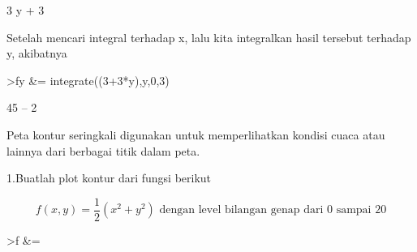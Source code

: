\documentclass[a4paper,10pt]{article}
\begin{document}
\begin{eulernotebook}
\begin{eulercomment}
\begin{eulercomment}
\begin{eulercomment}
\begin{eulercomment}
\begin{eulercomment}
\begin{eulercomment}
\begin{eulercomment}
\begin{eulercomment}
\begin{eulercomment}
\begin{eulercomment}
\begin{eulercomment}
\begin{eulercomment}
\begin{eulercomment}
\begin{eulercomment}
\begin{eulercomment}
\begin{eulercomment}
\begin{eulercomment}
\begin{eulercomment}
\begin{eulercomment}
\begin{eulercomment}
\begin{eulercomment}
\begin{eulercomment}
\begin{eulercomment}
\begin{eulercomment}
\begin{eulercomment}
\begin{eulercomment}
\begin{eulercomment}
\begin{eulercomment}
\begin{eulercomment}
\begin{eulercomment}
\begin{eulercomment}
\begin{eulercomment}
\begin{eulercomment}
\begin{eulercomment}
\begin{eulercomment}
\begin{eulercomment}
\begin{eulercomment}
\begin{eulercomment}
\begin{eulercomment}
\begin{eulercomment}
\begin{eulercomment}
\begin{eulercomment}
\begin{eulercomment}
\begin{eulercomment}
\begin{eulercomment}
\begin{eulercomment}
\begin{eulercomment}
\begin{eulercomment}
\begin{eulercomment}
\begin{eulercomment}
\begin{eulercomment}
\begin{eulercomment}
\begin{eulercomment}
\begin{eulercomment}
\begin{eulercomment}
\begin{eulercomment}
\begin{eulercomment}
\begin{eulercomment}
\begin{eulercomment}
\begin{eulercomment}
\begin{eulerprompt}
\end{eulerprompt}
\begin{euleroutput}
  
                                 3 y + 3
  
\end{euleroutput}
\begin{eulercomment}
Setelah mencari integral terhadap x, lalu kita integralkan hasil
tersebut terhadap y, akibatnya
\end{eulercomment}
\begin{eulerprompt}
>fy &= integrate((3+3*y),y,0,3)
\end{eulerprompt}
\begin{euleroutput}
  
                                    45
                                    --
                                    2
  
\end{euleroutput}
\begin{eulercomment}
\end{eulercomment}
\begin{eulercomment}
Peta kontur seringkali digunakan untuk memperlihatkan kondisi cuaca
atau lainnya dari berbagai titik dalam peta.

1.Buatlah plot kontur dari fungsi berikut

\end{eulercomment}
\begin{eulerformula}
\[
f(x,y) = \frac{1}{2}(x^2+y^2) \text{  dengan level bilangan genap dari 0 sampai 20}
\]
\end{eulerformula}
\begin{eulerprompt}
>f &= 
\end{eulerprompt}
\end{eulercomment}
\end{eulercomment}
\end{eulercomment}
\end{eulercomment}
\end{eulercomment}
\end{eulercomment}
\end{eulercomment}
\end{eulercomment}
\end{eulercomment}
\end{eulercomment}
\end{eulercomment}
\end{eulercomment}
\end{eulercomment}
\end{eulercomment}
\end{eulercomment}
\end{eulercomment}
\end{eulercomment}
\end{eulercomment}
\end{eulercomment}
\end{eulercomment}
\end{eulercomment}
\end{eulercomment}
\end{eulercomment}
\end{eulercomment}
\end{eulercomment}
\end{eulercomment}
\end{eulercomment}
\end{eulercomment}
\end{eulercomment}
\end{eulercomment}
\end{eulercomment}
\end{eulercomment}
\end{eulercomment}
\end{eulercomment}
\end{eulercomment}
\end{eulercomment}
\end{eulercomment}
\end{eulercomment}
\end{eulercomment}
\end{eulercomment}
\end{eulercomment}
\end{eulercomment}
\end{eulercomment}
\end{eulercomment}
\end{eulercomment}
\end{eulercomment}
\end{eulercomment}
\end{eulercomment}
\end{eulercomment}
\end{eulercomment}
\end{eulercomment}
\end{eulercomment}
\end{eulercomment}
\end{eulercomment}
\end{eulercomment}
\end{eulercomment}
\end{eulercomment}
\end{eulercomment}
\end{eulercomment}
\end{eulercomment}
\end{eulernotebook}
\end{document}
